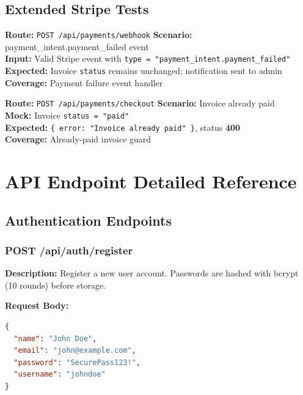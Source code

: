 \documentclass[12pt,a4paper]{report}
\newcommand{\pone}{\textbf{\color{p1red}P1}}
\newcommand{\ptwo}{\textbf{\color{p2orange}P2}}
\begin{document}
\section{Extended Stripe Tests}

\begin{tcolorbox}[testbox,title={STRIPE-006 \hfill \pone}]
\textbf{Route:} \texttt{POST /api/payments/webhook} \quad \textbf{Scenario:} payment\_intent.payment\_failed event \\
\textbf{Input:} Valid Stripe event with \texttt{type = "payment\_intent.payment\_failed"} \\
\textbf{Expected:} Invoice \texttt{status} remains unchanged; notification sent to admin \\
\textbf{Coverage:} Payment failure event handler
\end{tcolorbox}

\begin{tcolorbox}[testbox,title={STRIPE-007 \hfill \ptwo}]
\textbf{Route:} \texttt{POST /api/payments/checkout} \quad \textbf{Scenario:} Invoice already paid \\
\textbf{Mock:} Invoice \texttt{status = "paid"} \\
\textbf{Expected:} \texttt{\{ error: "Invoice already paid" \}}, status \textbf{400} \\
\textbf{Coverage:} Already-paid invoice guard
\end{tcolorbox}

\chapter{API Endpoint Detailed Reference}
\section{Authentication Endpoints}

\subsection{POST /api/auth/register}

\textbf{Description:} Register a new user account. Passwords are hashed with bcrypt (10 rounds) before storage.

\textbf{Request Body:}
\begin{lstlisting}[language=JSON,caption={Register request body}]
{
  "name": "John Doe",
  "email": "john@example.com",
  "password": "SecurePass123!",
  "username": "johndoe"
}
\end{lstlisting}
\end{document}

